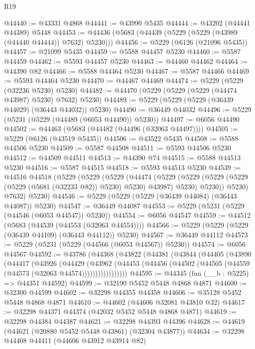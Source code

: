 \begin{lexlean}{R19}
\begin{coremodule}
@44440 := @43331 @4868
@44441 := @43990 @5435
@44444 := @43202 (@44441 @44389) @5448
@44453 := @44436 (@5683 (@44439 (@5229 (@5229 (@43989 (@44440 @44444)) @7632) @5230)))
@44456 := @5229 (@6126 (@21096 @5435))
@44457 := @21099 @5435
@44459 := @5588 @44457 @5230
@44460 := @5587 @44459
@44462 := @5593 @44457 @5230
@44463 := @44460 @44462
@44464 := @44390 @82
@44466 := @5588 @44464 @5230
@44467 := @5587 @44466
@44469 := @5593 @44464 @5230
@44470 := @44467 @44469
@44474 := @5229 (@5229 (@32236 @5230) @5230)
@44482 := @44470 (@5229 (@5229 (@5229 (@44474 @43987) @5230) @7632) @5230)
@44489 := @5229 (@5229 (@5229 (@36439 @44029) (@36443 @44032)) @5230)
@44490 := @36449 @44032
@44496 := @5229 (@5231 (@5229 (@44489 (@6053 @44490)) @5230))
@44497 := @6056 @44490
@44502 := @44463 (@5683 (@44482 (@44496 (@32063 @44497))))
@44505 := @5229 (@6126 (@43519 @5435))
@44506 := @43522 @5435
@44508 := @5588 @44506 @5230
@44509 := @5587 @44508
@44511 := @5593 @44506 @5230
@44512 := @44509 @44511
@44513 := @44390 @74
@44515 := @5588 @44513 @5230
@44516 := @5587 @44515
@44518 := @5593 @44513 @5230
@44539 := @44516
    @44518
    (@5229
      (@5229
        (@5229
          (@44474
            (@5229
              (@5229 (@5229 (@5229 (@5229 (@5681 (@32233 @82)) @5230) @5230) @43987) @5230)
              @5230))
          @5230)
        @7632)
      @5230)
@44546 := @5229 (@5229 (@5229 (@36439 @44084) (@36443 @44087)) @5230)
@44547 := @36449 @44087
@44553 := @5229 (@5231 (@5229 (@44546 (@6053 @44547)) @5230))
@44554 := @6056 @44547
@44559 := @44512 (@5683 (@44539 (@44553 (@32063 @44554))))
@44566 := @5229 (@5229 (@5229 (@36439 @44109) (@36443 @44112)) @5230)
@44567 := @36449 @44112
@44573 := @5229 (@5231 (@5229 (@44566 (@6053 @44567)) @5230))
@44574 := @6056 @44567
@44592 := @43786
    (@44368
      (@43822
        (@44381
          (@43844
            (@44405
              (@43890
                (@44417
                  (@43926
                    (@44429
                      (@43962
                        (@44453
                          (@44456 (@44502 (@44505 (@44559 (@44573 (@32063 @44574)))))))))))))))))
@44595 := @44345 (fun (__b : @5225) => @44351 @44592)
@44599 := @32190 @5452 @5448 @4868 @4871
@44600 := @32300 @44599
@44602 := @32298 @44355 @44358
@44606 := @35128 @5452 @5448 @4868 @4871
@44610 := @44602 (@44606 @32081 @43810 @32)
@44617 := @32298 @44371 @44374 (@42032 @5452 @5448 @4868 @4871)
@44619 := @32298 @44384 @44387
@44621 := @32298 @44393 @44396
@44628 := @44619 (@44621 (@20880 @5452 @5448 @43861) (@32304 @43877))
@44634 := @32298 @44408 @44411 (@44606 @43912 @43914 @82)

\end{coremodule}
\end{lexlean}
